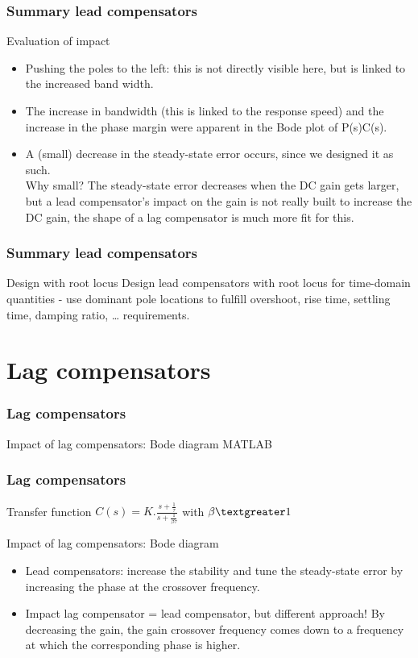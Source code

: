 \begin{frame}
\frametitle{Summary lead compensators}
\begin{block}{Evaluation of impact}
\begin{itemize}
	\item Pushing the poles to the left: this is not directly visible here, but is linked to the increased band width.
	\item The increase in bandwidth (this is linked to the response speed) and the increase in the phase margin were apparent in the Bode plot of P(s)C(s).
	\item A (small) decrease in the steady-state error occurs, since we designed it as such. \\
	Why small? The steady-state error decreases when the DC gain gets larger, but a lead compensator’s impact on the gain is not really built to increase the DC gain, the shape of a lag compensator is much more fit for this.
\end{itemize}
\end{block}
\end{frame}

\begin{frame}
	\frametitle{Summary lead compensators}
	\begin{block}{Design with root locus}
	Design lead compensators with root locus for time-domain quantities  - use dominant pole locations to fulfill overshoot, rise time, settling time, damping ratio, … requirements.
	\end{block}
\end{frame}

\section{Lag compensators}

\begin{frame}
\frametitle{Lag compensators}
\begin{block}{Impact of lag compensators: Bode diagram}
	MATLAB
\end{block}
\end{frame}

\begin{frame}
	\frametitle{Lag compensators}
	\begin{block}{Transfer function}
		$C(s) = K.\frac{s + \frac{1}{\tau}}{s + \frac{1}{\beta\tau}}$ with $\beta  \textgreater  1$
	\end{block}
	\begin{block}{Impact of lag compensators: Bode diagram}
	\begin{itemize}
		\item Lead compensators: increase the stability and tune the steady-state error by increasing the phase at the crossover frequency.
		\item Impact lag compensator = lead compensator, but different approach!
		By decreasing the gain, the gain crossover frequency comes down to a frequency at which the corresponding phase is higher.
		
	\end{itemize}
	\end{block}
\end{frame}


